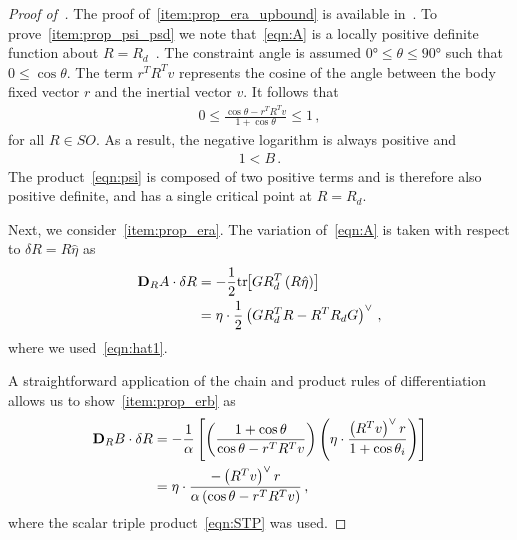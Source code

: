 \documentclass[letterpaper, 10 pt, conference]{ieeeconf}  %
\begin{document}
\begin{proof}[Proof of~]\label{proof:config_error}
The proof of~\cref{item:prop_era_upbound} is available in~\cite{lee2011a}.
To prove~\cref{item:prop_psi_psd} we note that~\cref{eqn:A} is a locally positive definite function about \( R = R_d \)~\cite{bullo2004}.
The constraint angle is assumed \( \ang{0} \leq \theta \leq \ang{90} \) such that \( 0 \leq \cos \theta \).
The term \( r^T R^T v \) represents the cosine of the angle between the body fixed vector \( r \) and the inertial vector \( v \). 
It follows that
\begin{align*}
	0 \leq  \frac{\cos \theta -  r^T R^T v}{1 + \cos \theta} \leq 1 \, ,
\end{align*}
for all \( R \in SO \). 
As a result, the negative logarithm is always positive and
\begin{align*}
	1 < B \, .
\end{align*}
The product~\cref{eqn:psi} is composed of two positive terms and is therefore also positive definite, and has a single critical point at \( R = R_d \).

Next, we consider~\cref{item:prop_era}.
The variation of~\cref{eqn:A} is taken with respect to \( \delta R = R \hat \eta \) as
\begin{align*}
	\mathbf{D}_{R} A \cdot \delta R &= -\frac{1}{2} \mathrm{tr}\negthickspace\left[ G R_d^T \left( R \hat{\eta}\right) \right] \\
	&= \eta \cdot \frac{1}{2} \left( G R_d^T R - R^T R_d G\right)^\vee \, ,
\end{align*}
where we used~\cref{eqn:hat1}.

A straightforward application of the chain and product rules of differentiation allows us to show~\cref{item:prop_erb} as
\begin{align*}
	\mathbf{D}_{R} B \cdot \delta R &= -\frac{1}{\alpha} \left[\left(\frac{1+\cos \theta}{\cos \theta - r^T R^T v} \right) \left(\eta \cdot \frac{\left( R^T v\right)^\vee r}{1+\cos \theta_i} \right) \right]  \\
	&= \eta \cdot \frac{ - \left( R^T v\right)^\vee r}{\alpha \left(\cos \theta - r^T R^T v \right)} \, ,
\end{align*}
where the scalar triple product~\cref{eqn:STP} was used.


\end{proof}
\end{document}
